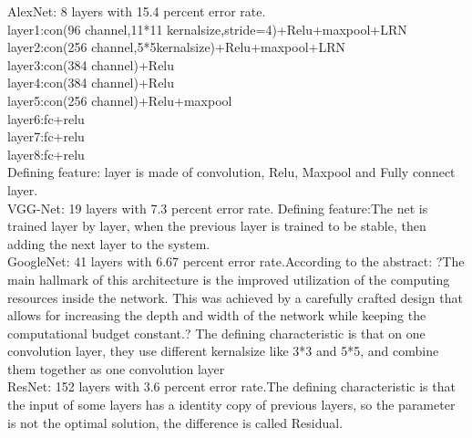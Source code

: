 \documentclass[12pt]{article}
\begin{document}
\begin{itemize}
AlexNet: 8 layers with 15.4 percent error rate.\\
layer1:con(96 channel,11*11 kernalsize,stride=4)+Relu+maxpool+LRN\\
layer2:con(256 channel,5*5kernalsize)+Relu+maxpool+LRN\\
layer3:con(384 channel)+Relu\\
layer4:con(384 channel)+Relu\\
layer5:con(256 channel)+Relu+maxpool\\
layer6:fc+relu\\
layer7:fc+relu\\
layer8:fc+relu\\
Defining feature: layer is made of convolution, Relu, Maxpool and Fully connect layer.\\





VGG-Net: 19 layers with 7.3 percent error rate. Defining feature:The net is trained layer by layer, when the previous layer is trained to be stable, then adding the next layer to the system.\\
GoogleNet: 41 layers with 6.67 percent error rate.According to the abstract: ?The main hallmark of this architecture is the improved utilization of the computing resources inside the network. This was achieved by a carefully crafted design that allows for increasing the depth and width of the network while keeping the computational budget constant.? The defining characteristic is that on one convolution layer, they use different kernalsize like 3*3 and 5*5, and combine them together as one convolution layer \\
ResNet:  152 layers with 3.6 percent error rate.The defining characteristic is that the input of some layers has a identity copy of previous layers, so the parameter is not the optimal solution, the difference is called Residual. \\

\end{itemize}
\end{document}
